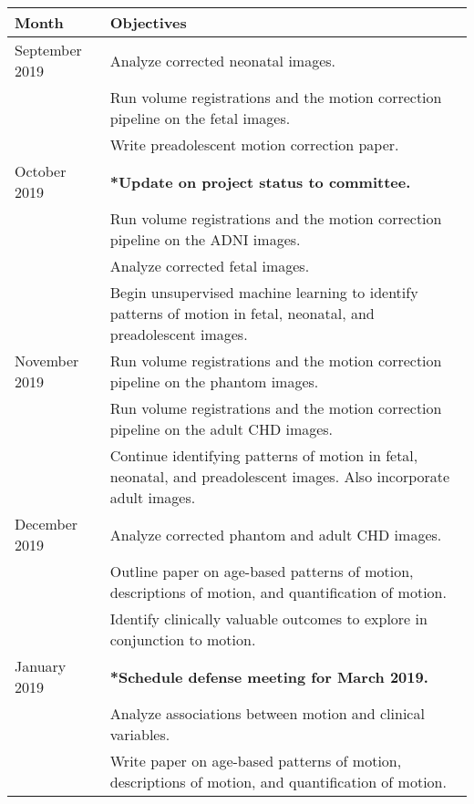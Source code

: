 \begin{table}[t]
\begin{tabular}{p{}|p{}}
\textbf{Month} & \multicolumn{1}{l}{\textbf{Objectives}}                                                                         \\ \hline
September 2019 & Analyze corrected neonatal images. \\
               & Run volume registrations and the motion correction pipeline on the fetal images. \\
               & Write preadolescent motion correction paper.                                                                     \\ \hline
October 2019   & \textbf{*Update on project status to committee.} \\                                             
               & Run volume registrations and the motion correction pipeline on the ADNI images.                                  \\
               & Analyze corrected fetal images.                                                                                  \\
               & Begin unsupervised machine learning to identify patterns of motion in fetal, neonatal, and preadolescent images.  
\\ \hline
November 2019  & Run volume registrations and the motion correction pipeline on the phantom images.                                   \\
              & Run volume registrations and the motion correction pipeline on the adult CHD images.                                 \\
   & Continue identifying patterns of motion in fetal, neonatal, and preadolescent images. Also incorporate adult images. \\ \hline

December 2019  & Analyze corrected phantom and adult CHD images.                                                                      \\
       & Outline paper on age-based patterns of motion, descriptions of motion, and quantification of motion.                 \\
            & Identify clinically valuable outcomes to explore in conjunction to motion.                                           \\ \hline
January 2019  & \textbf{*Schedule defense meeting for March 2019.}                                                                   \\
          & Analyze associations between motion and clinical variables.                                                          \\
           & Write paper on age-based patterns of motion, descriptions of motion, and quantification of motion.                   \\ \hline


\end{tabular}
\end{table}
